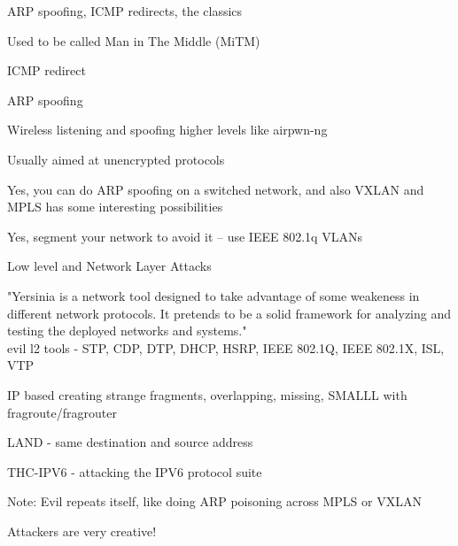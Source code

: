 \documentclass[Screen16to9,17pt]{foils}
\begin{document}
\begin{list2}
\item ARP spoofing, ICMP redirects, the classics
\item Used to be called Man in The Middle (MiTM)
\begin{list2}
\item ICMP redirect
\item ARP spoofing
\item Wireless listening and spoofing higher levels like  airpwn-ng 
\end{list2}
\item Usually aimed at unencrypted protocols
\item Yes, you can do ARP spoofing on a switched network, and also VXLAN and MPLS has some interesting possibilities
\item Yes, segment your network to avoid it -- use IEEE 802.1q VLANs {\myalert}
\end{list2}




\begin{list1}
\item Low level and Network Layer Attacks
\begin{list2}
\item "Yersinia is a network tool designed to take advantage of some weakeness in different network protocols. It pretends to be a solid framework for analyzing and testing the deployed networks and systems."\\
evil l2 tools - STP, CDP, DTP, DHCP, HSRP, IEEE 802.1Q, IEEE 802.1X, ISL, VTP\\
\item IP based creating strange fragments, overlapping, missing, SMALLL with fragroute/fragrouter
\item LAND - same destination and source address
\item THC-IPV6 - attacking the IPV6 protocol suite
\end{list2}
\item Note: Evil repeats itself, like doing ARP poisoning across MPLS or VXLAN
\end{list1}

\vskip 1cm
\centerline{\Large Attackers are very creative!}


\end{document}
